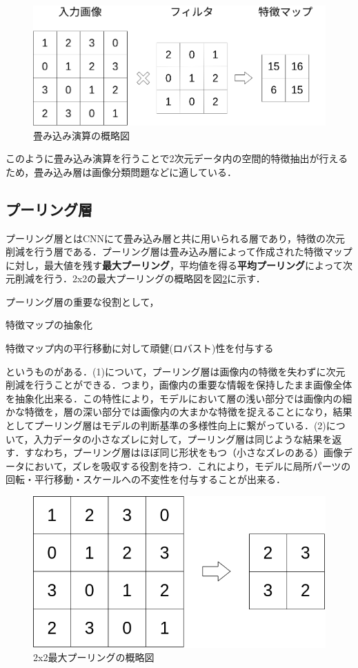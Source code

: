 \documentclass[a4j, 11pt]{jreport}
\begin{document}
\begin{figure}[htbp]
 \centering
 \includegraphics[width=0.9\hsize, keepaspectratio]{images/drawio/conv2d.png}
 \caption{畳み込み演算の概略図}
 \label{fig:conv2d}
\end{figure}

このように畳み込み演算を行うことで2次元データ内の空間的特徴抽出が行えるため，畳み込み層は画像分類問題などに適している．

\subsection{プーリング層}
プーリング層とはCNNにて畳み込み層と共に用いられる層であり，特徴の次元削減を行う層である．プーリング層は畳み込み層によって作成された特徴マップに対し，最大値を残す\textbf{最大プーリング}，平均値を得る\textbf{平均プーリング}によって次元削減を行う．2x2の最大プーリングの概略図を図\ref{fig:maxpooling}に示す．

プーリング層の重要な役割として，
\begin{inparaenum}[(1)]
 \item 特徴マップの抽象化
 \item 特徴マップ内の平行移動に対して頑健(ロバスト)性を付与する
\end{inparaenum}
というものがある．(1)について，プーリング層は画像内の特徴を失わずに次元削減を行うことができる．つまり，画像内の重要な情報を保持したまま画像全体を抽象化出来る．この特性により，モデルにおいて層の浅い部分では画像内の細かな特徴を，層の深い部分では画像内の大まかな特徴を捉えることになり，結果としてプーリング層はモデルの判断基準の多様性向上に繋がっている．(2)について，入力データの小さなズレに対して，プーリング層は同じような結果を返す．すなわち，プーリング層はほぼ同じ形状をもつ（小さなズレのある）画像データにおいて，ズレを吸収する役割を持つ．これにより，モデルに局所パーツの回転・平行移動・スケールへの不変性を付与することが出来る．

\begin{figure}[H]
 \centering
 \includegraphics[width=0.8\hsize, keepaspectratio]{images/drawio/maxpooling.png}
 \caption{2x2最大プーリングの概略図}
 \label{fig:maxpooling}
\end{figure}
\end{document}
